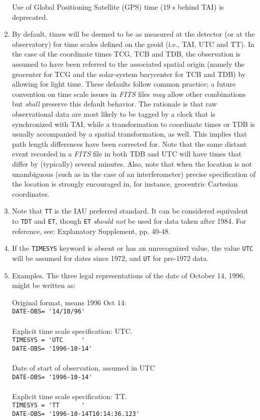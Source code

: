 \documentclass[onecolumn]{aa}
\begin{document}
\begin{enumerate}
  Use of Global Positioning Satellite (GPS) time (19 s behind TAI) is 
deprecated. 
 
\item By default, times will be deemed to be as measured at the detector (or
   at the observatory) for time scales defined on the geoid (i.e., TAI, UTC and
  TT).  In the case of the coordinate times TCG, TCB and TDB, the
  observation is assumed to have been referred to the associated spatial
  origin (namely the geocenter for TCG and the solar-system barycenter for
  TCB and TDB) by allowing for light time.  
   These
   defaults follow common practice; a future convention on time scale issues
   in {\em FITS\/} files {\em may} allow other combinations 
   but {\em shall} preserve this default
   behavior.  The rationale is that raw observational data are most likely
   to be tagged by a clock that is synchronized with TAI, while a
   transformation to coordinate times or TDB is usually accompanied by a
   spatial transformation, as well.  This implies that path length differences
   have been corrected for.  
   Note that the same distant event recorded in a {\em FITS\/} file in both TDB and UTC
   will have times that differ by (typically) several minutes.
   Also, note that when the location
   is not unambiguous (such as in the case of an interferometer) precise
   specification of the location is strongly encouraged in, for instance,
   geocentric Cartesian coordinates.
 
\item Note that {\tt TT} is the IAU preferred standard.  It can be considered
   equivalent to {\tt TDT} and {\tt ET}, though {\tt ET} {\em should not} be used 
   for data
   taken after 1984.  For reference, see: Explanatory Supplement, pp. 40-48.
 
\item If the {\tt TIMESYS} keyword is absent or has an unrecognized value,
   the value {\tt UTC} will be assumed for dates since 1972, 
   and {\tt UT} for pre-1972 data.
 
\item Examples.
   The three legal representations of the date of October 14, 1996, 
might be written as:
 
Original format, means 1996 Oct 14:\\
{\verb+DATE-OBS= '14/10/96'+}\\
\\
Explicit time scale specification: UTC. \\
{\verb+TIMESYS = 'UTC     '+}   \\
{\verb+DATE-OBS= '1996-10-14'+}   \\
 \\
Date of start of observation, assumed in UTC\\
{\verb+DATE-OBS= '1996-10-14'+}\\
 \\
Explicit time scale specification: TT. \\
{\verb+TIMESYS = 'TT      '+} \\
{\verb+DATE-OBS= '1996-10-14T10:14:36.123'+} \\
 

\end{enumerate}
\end{document}
